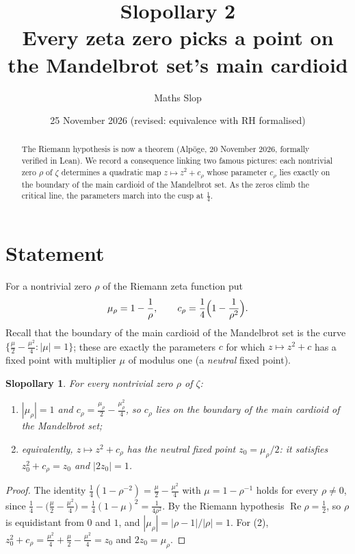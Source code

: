 \documentclass[11pt,a4paper]{article}
\title{\textbf{Slopollary 2}\\[2pt]\large Every zeta zero picks a point on the Mandelbrot set's main cardioid}
\author{Maths Slop}
\date{25 November 2026 (revised: equivalence with RH formalised)}
\newtheorem{theorem}{Slopollary}\setcounter{theorem}{1}
\theoremstyle{remark}\newtheorem*{remark}{Remarks}
\begin{document}
\maketitle

\begin{abstract}
The Riemann hypothesis is now a theorem (Alp\"oge, 20 November 2026, formally
verified in Lean). We record a consequence linking two famous pictures: each
nontrivial zero $\rho$ of $\zeta$ determines a quadratic map $z\mapsto z^{2}+c_\rho$
whose parameter $c_\rho$ lies exactly on the boundary of the main cardioid of the
Mandelbrot set. As the zeros climb the critical line, the parameters march into
the cusp at $\tfrac14$.
\end{abstract}

\section*{Statement}
For a nontrivial zero $\rho$ of the Riemann zeta function put
\[
  \mu_\rho = 1-\frac1\rho ,\qquad c_\rho=\frac14\Bigl(1-\frac1{\rho^{2}}\Bigr).
\]
Recall that the boundary of the main cardioid of the Mandelbrot set is the curve
$\bigl\{\tfrac{\mu}{2}-\tfrac{\mu^{2}}{4} : |\mu|=1\bigr\}$; these are exactly the
parameters $c$ for which $z\mapsto z^{2}+c$ has a fixed point with multiplier $\mu$
of modulus one (a \emph{neutral} fixed point).

\begin{theorem}
For every nontrivial zero $\rho$ of $\zeta$:
\begin{enumerate}
  \item $|\mu_\rho|=1$ and $c_\rho=\tfrac{\mu_\rho}{2}-\tfrac{\mu_\rho^{2}}{4}$, so
        $c_\rho$ lies on the boundary of the main cardioid of the Mandelbrot set;
  \item equivalently, $z\mapsto z^{2}+c_\rho$ has the neutral fixed point
        $z_0=\mu_\rho/2$: it satisfies $z_0^{2}+c_\rho=z_0$ and $|2z_0|=1$.
\end{enumerate}
\end{theorem}

\begin{proof}
The identity $\tfrac14(1-\rho^{-2})=\tfrac{\mu}{2}-\tfrac{\mu^{2}}{4}$ with
$\mu=1-\rho^{-1}$ holds for every $\rho\neq0$, since
$\tfrac14-\bigl(\tfrac{\mu}{2}-\tfrac{\mu^{2}}{4}\bigr)=\tfrac14(1-\mu)^{2}=\tfrac1{4\rho^{2}}$.
By the Riemann hypothesis $\operatorname{Re}\rho=\tfrac12$, so $\rho$ is equidistant
from $0$ and $1$, and $|\mu_\rho|=|\rho-1|/|\rho|=1$. For (2),
$z_0^{2}+c_\rho=\tfrac{\mu^{2}}{4}+\tfrac{\mu}{2}-\tfrac{\mu^{2}}{4}=z_0$ and $2z_0=\mu_\rho$.
\end{proof}
\end{document}
